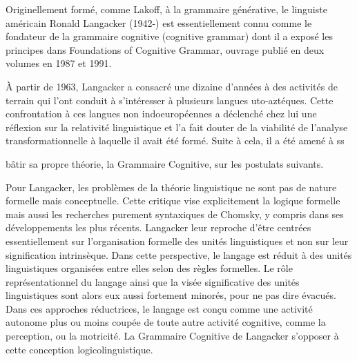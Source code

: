  Originellement formé, comme Lakoff, à la grammaire générative, le linguiste américain Ronald Langacker (1942-) est essentiellement connu comme le fondateur de la grammaire cognitive (cognitive grammar) dont il a exposé les principes dans Foundations of Cognitive Grammar, ouvrage publié en deux volumes en 1987 et 1991.\par

 À partir de 1963, Langacker a consacré une dizaine d’années à des activités de terrain qui l’ont conduit à s’intéresser à plusieurs langues uto-aztéques. Cette confrontation à ces langues non indoeuropéennes a déclenché chez lui une réflexion sur la relativité linguistique et l’a fait douter de la viabilité de l’analyse transformationnelle à laquelle il avait été formé. Suite à cela, il a été amené à ss\par


bâtir sa propre théorie, la Grammaire Cognitive, sur les postulats suivants.\par


Pour Langacker, les problèmes de la théorie linguistique ne sont pas de nature formelle mais conceptuelle. Cette critique vise explicitement la logique formelle mais aussi les recherches purement syntaxiques de Chomsky, y compris dans ses développements les plus récents. Langacker leur reproche d’être centrées essentiellement sur l’organisation formelle des unités linguistiques et non sur leur signification intrinsèque. Dans cette perspective, le langage est réduit à des unités linguistiques organisées entre elles selon des règles formelles. Le rôle représentationnel du langage ainsi que la visée significative des unités linguistiques sont alors eux aussi fortement minorés, pour ne pas dire évacués. Dans ces approches réductrices, le langage est conçu comme une activité autonome plus ou moins coupée de toute autre activité cognitive, comme la perception, ou la motricité. La Grammaire Cognitive de Langacker s'opposer à cette conception logicolinguistique.\par


